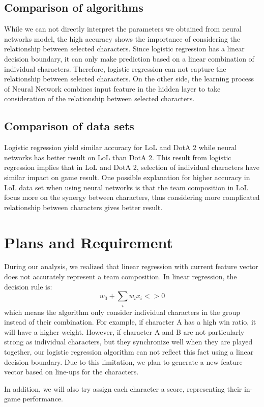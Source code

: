 \documentclass[conference]{IEEEtran}
\begin{document}
\subsection{Comparison of algorithms}
While we can not directly interpret the parameters we obtained from neural networks model, the high accuracy shows the importance of considering the relationship between selected characters. Since logistic regression has a linear decision boundary, it can only make prediction based on a linear combination of individual characters. Therefore, logistic regression can not capture the relationship between selected characters. On the other side, the learning process of Neural Network combines input feature in the hidden layer to take consideration of the relationship between selected characters.

\subsection{Comparison of data sets}
Logistic regression yield similar accuracy for LoL and DotA 2 while neural networks has better result on LoL than DotA 2. This result from logistic regression implies that in LoL and DotA 2, selection of individual characters have similar impact on game result. One possible explanation for higher accuracy in LoL data set when using neural networks is that the team composition in LoL focus more on the synergy between characters, thus considering more complicated relationship between characters gives better result. 
\section{Plans and Requirement}

During our analysis, we realized that linear regression with current feature vector does not accurately represent a team composition. In linear regression, the decision rule is:
\[
w_0 + \sum_i w_i x_i <>0
\]
which means the algorithm only consider individual characters in the group instead of their combination. For example, if character A has a high win ratio, it will have a higher weight. However, if character A and B are not particularly strong as individual characters, but they synchronize well when they are played together, our logistic regression algorithm can not reflect this fact using a linear decision boundary. Due to this limitation, we plan to generate a new feature vector based on line-ups for the characters.

In addition, we will also try assign each character a score, representing their in-game performance.
\end{document}
